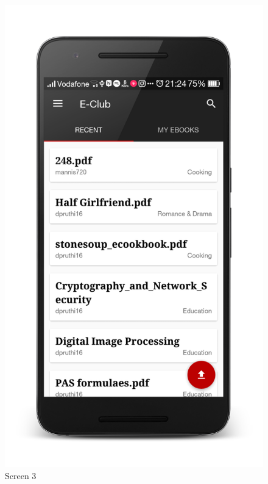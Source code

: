\begin{figure}[ht]
\centering
\includegraphics[scale=0.13]{images/d14.png}
\caption{Screen 3}
\end{figure}

\newpage

